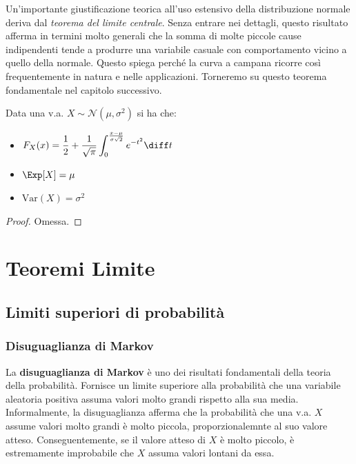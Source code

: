 \documentclass[a4paper, 12pt]{report}
\begin{document}
    Un'importante giustificazione teorica all'uso estensivo della distribuzione normale deriva dal \textit{teorema del limite centrale}. Senza entrare nei dettagli, questo risultato afferma in termini molto generali che la somma di molte piccole cause indipendenti tende a produrre una variabile casuale con comportamento vicino a quello della normale. Questo spiega perché la curva a campana ricorre così frequentemente in natura e nelle applicazioni. Torneremo su questo teorema fondamentale nel capitolo successivo.

    \begin{framedprop}{}
        Data una v.a. $X \sim \mathcal{N}(\mu, \sigma^2)$ si ha che:
        \begin{itemize}
            \item $\displaystyle F_X(x) = \frac{1}{2} + \frac{1}{\sqrt{\pi}} \int_{0}^{\frac{x-\mu}{\sigma \sqrt{2}}} e^{-t^2} \diff t$
            \item $\Exp[X] = \mu$
            \item $\mathrm{Var}(X) = \sigma^2$
        \end{itemize}
    \end{framedprop}

    \begin{proof}
        Omessa.
    \end{proof}

    \chapter{Teoremi Limite}

    \section{Limiti superiori di probabilità}

    \subsection{Disuguaglianza di Markov}

    La \textbf{disuguaglianza di Markov} è uno dei risultati fondamentali della teoria della probabilità. Fornisce un limite superiore alla probabilità che una variabile aleatoria positiva assuma valori molto grandi rispetto alla sua media. Informalmente, la disuguaglianza afferma che la probabilità che una v.a. $X$ assume valori molto grandi è molto piccola, proporzionalemnte al suo valore atteso. Conseguentemente, se il valore atteso di $X$ è molto piccolo, è estremamente improbabile che $X$ assuma valori lontani da essa.
\end{document}

